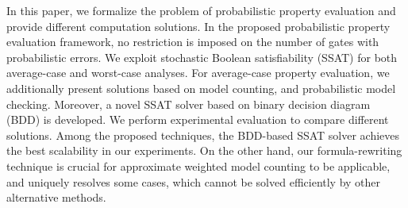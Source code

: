 In this paper, we formalize the problem of probabilistic property evaluation and provide different computation solutions.
In the proposed probabilistic property evaluation framework, no restriction is imposed on the number of gates with probabilistic errors.
We exploit stochastic Boolean satisfiability (SSAT) for both average-case and worst-case analyses.
For average-case property evaluation, we additionally present solutions based on model counting, and probabilistic model checking.
Moreover, a novel SSAT solver based on binary decision diagram (BDD) is developed.
We perform experimental evaluation to compare different solutions.
Among the proposed techniques, the BDD-based SSAT solver achieves the best scalability in our experiments.
On the other hand, our formula-rewriting technique is crucial for approximate weighted model counting to be applicable, and uniquely resolves some cases, which cannot be solved efficiently by other alternative methods.